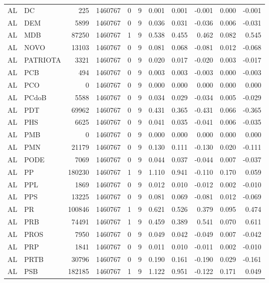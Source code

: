 \begin{landscape}
\begin{longtable}{llrrrrrrrrr}
AL & DC & 225 & 1460767 & 0 & 9 & 0.001 & 0.001 & -0.001 & 0.000 & -0.001 \\
AL & DEM & 5899 & 1460767 & 0 & 9 & 0.036 & 0.031 & -0.036 & 0.006 & -0.031 \\
AL & MDB & 87250 & 1460767 & 1 & 9 & 0.538 & 0.455 & 0.462 & 0.082 & 0.545 \\
AL & NOVO & 13103 & 1460767 & 0 & 9 & 0.081 & 0.068 & -0.081 & 0.012 & -0.068 \\
AL & PATRIOTA & 3321 & 1460767 & 0 & 9 & 0.020 & 0.017 & -0.020 & 0.003 & -0.017 \\
AL & PCB & 494 & 1460767 & 0 & 9 & 0.003 & 0.003 & -0.003 & 0.000 & -0.003 \\
AL & PCO & 0 & 1460767 & 0 & 9 & 0.000 & 0.000 & 0.000 & 0.000 & 0.000 \\
AL & PCdoB & 5588 & 1460767 & 0 & 9 & 0.034 & 0.029 & -0.034 & 0.005 & -0.029 \\
AL & PDT & 69962 & 1460767 & 0 & 9 & 0.431 & 0.365 & -0.431 & 0.066 & -0.365 \\
AL & PHS & 6625 & 1460767 & 0 & 9 & 0.041 & 0.035 & -0.041 & 0.006 & -0.035 \\
AL & PMB & 0 & 1460767 & 0 & 9 & 0.000 & 0.000 & 0.000 & 0.000 & 0.000 \\
AL & PMN & 21179 & 1460767 & 0 & 9 & 0.130 & 0.111 & -0.130 & 0.020 & -0.111 \\
AL & PODE & 7069 & 1460767 & 0 & 9 & 0.044 & 0.037 & -0.044 & 0.007 & -0.037 \\
AL & PP & 180230 & 1460767 & 1 & 9 & 1.110 & 0.941 & -0.110 & 0.170 & 0.059 \\
AL & PPL & 1869 & 1460767 & 0 & 9 & 0.012 & 0.010 & -0.012 & 0.002 & -0.010 \\
AL & PPS & 13225 & 1460767 & 0 & 9 & 0.081 & 0.069 & -0.081 & 0.012 & -0.069 \\
AL & PR & 100846 & 1460767 & 1 & 9 & 0.621 & 0.526 & 0.379 & 0.095 & 0.474 \\
AL & PRB & 74491 & 1460767 & 1 & 9 & 0.459 & 0.389 & 0.541 & 0.070 & 0.611 \\
AL & PROS & 7950 & 1460767 & 0 & 9 & 0.049 & 0.042 & -0.049 & 0.007 & -0.042 \\
AL & PRP & 1841 & 1460767 & 0 & 9 & 0.011 & 0.010 & -0.011 & 0.002 & -0.010 \\
AL & PRTB & 30796 & 1460767 & 0 & 9 & 0.190 & 0.161 & -0.190 & 0.029 & -0.161 \\
AL & PSB & 182185 & 1460767 & 1 & 9 & 1.122 & 0.951 & -0.122 & 0.171 & 0.049 \\

\end{longtable}
\end{landscape}

